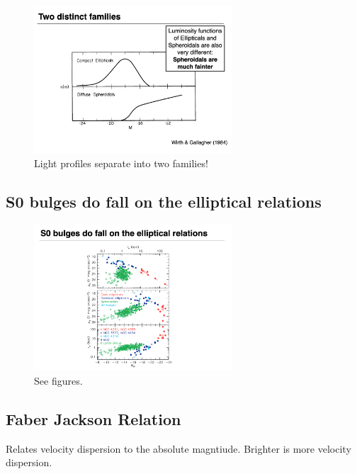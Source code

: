 \documentclass{article}
\begin{document}
\begin{figure}
    \centering
\includegraphics[width=0.66\textwidth]{figs/Screen Shot 2021-10-15 at 10.24.40 AM.png}
    \caption{Light profiles separate into two families!}
    \label{fig:twofamiles}
\end{figure}

\subsection{S0 bulges do fall on the elliptical relations}

\begin{figure}
    \centering
\includegraphics[width=0.66\textwidth]{figs/Screen Shot 2021-10-15 at 10.25.33 AM.png}
    \caption{See figures.}
    \label{fig:bulge_on_relation}
\end{figure}

\subsection{Faber Jackson Relation}

Relates velocity dispersion to the absolute magntiude. Brighter is more velocity dispersion.
\end{document}
